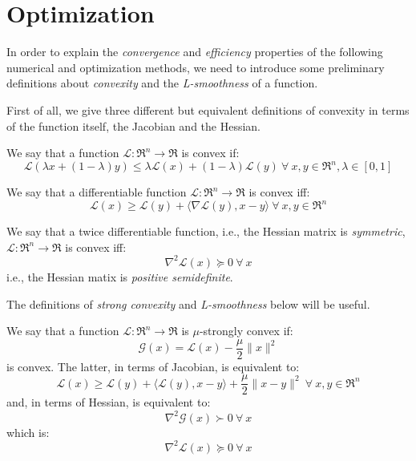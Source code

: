 \section{Optimization}

In order to explain the \emph{convergence} and \emph{efficiency} properties of the following numerical and optimization methods, we need to introduce some preliminary definitions about \emph{convexity} and the \emph{L-smoothness} of a function.

First of all, we give three different but equivalent definitions of convexity in terms of the function itself, the Jacobian and the Hessian.

\begin{definition}[Convexity]
We say that a function $\mathcal{L}: \Re^{n} \rightarrow \Re$ is convex if: 
$$ 
\mathcal{L}(\lambda x + (1 - \lambda) y ) \leq \lambda \mathcal{L}(x) + (1 - \lambda) \mathcal{L}(y) \ \forall \ x, y \in \Re^{n}, \lambda \in [0,1] 
$$
\end{definition}

\begin{definition}
We say that a differentiable function $\mathcal{L}: \Re^{n} \rightarrow \Re$ is convex iff: 
$$
\mathcal{L}(x) \geq \mathcal{L}(y) + \langle \nabla \mathcal{L}(y), x - y \rangle \ \forall \ x, y \in \Re^{n}
$$
\end{definition}

\begin{definition}
We say that a twice differentiable function, i.e., the Hessian matrix is \emph{symmetric}, $\mathcal{L}: \Re^{n} \rightarrow \Re$ is convex iff: 
$$
\nabla^2 \mathcal{L}(x) \succeq 0 \ \forall \ x
$$
i.e., the Hessian matix is \emph{positive semidefinite}.
\end{definition}

The definitions of \emph{strong convexity} and \emph{L-smoothness} below will be useful.

\begin{definition}
We say that a function $\mathcal{L}: \Re^{n} \rightarrow \Re$ is $\mu$-strongly convex if:
$$
\mathcal{G}(x) = \mathcal{L}(x) - \frac{\mu}{2} \| x \|^2
$$
is convex. The latter, in terms of Jacobian, is equivalent to:
$$
\mathcal{L}(x) \geq \mathcal{L}(y) + \langle \mathcal{L}(y), x - y \rangle + \frac{\mu}{2} \| x - y \|^2 \ \forall \ x, y \in \Re^{n}
$$
and, in terms of Hessian, is equivalent to:
$$
\nabla^2 \mathcal{G}(x) \succ 0 \ \forall \ x
$$
which is:
$$
\nabla^2 \mathcal{L}(x) \succeq 0 \ \forall \ x
$$
\end{definition}

